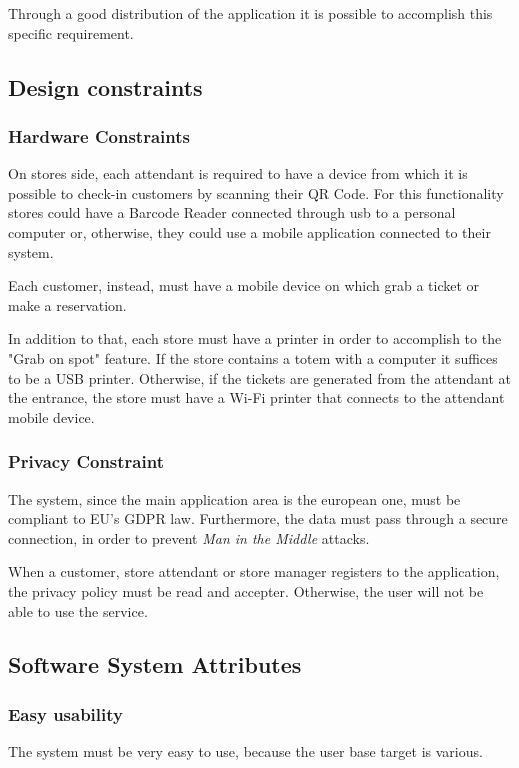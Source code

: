 \documentclass[table, 12pt]{article}
\begin{document}
\begin{flushleft}
    Through a good distribution of the application it is possible to accomplish this specific requirement.

    \subsection{Design constraints}
    \subsubsection{Hardware Constraints}
    On stores side, each attendant is required to have a device from which it is possible to check-in customers by scanning their QR Code.
    For this functionality stores could have a Barcode Reader connected through usb to a personal computer or, otherwise, they could use a mobile application connected to their system.

    Each customer, instead, must have a mobile device on which grab a ticket or make a reservation.

    In addition to that, each store must have a printer in order to accomplish to the "Grab on spot" feature. If the store contains a totem with a computer it suffices to be a USB printer. Otherwise, if the tickets are generated from the attendant at the entrance, the store must have a Wi-Fi printer that connects to the attendant mobile device.

    \subsubsection{Privacy Constraint}
    The system, since the main application area is the european one, must be compliant to EU's GDPR law. Furthermore, the data must pass through a secure connection, in order to prevent \textit{Man in the Middle} attacks.

    When a customer, store attendant or store manager registers to the application, the privacy policy must be read and accepter. Otherwise, the user will not be able to use the service.

    \subsection{Software System Attributes}
    \subsubsection{Easy usability}
    The system must be very easy to use, because the user base target is various.


\end{flushleft}
\end{document}
